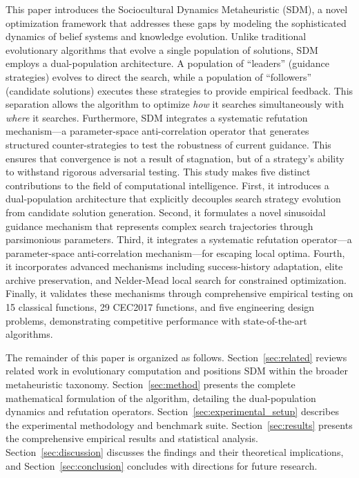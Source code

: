 \documentclass[11pt]{article}
\begin{document}
This paper introduces the Sociocultural Dynamics Metaheuristic (SDM), a novel optimization framework that addresses these gaps by modeling the sophisticated dynamics of belief systems and knowledge evolution. Unlike traditional evolutionary algorithms that evolve a single population of solutions, SDM employs a dual-population architecture. A population of ``leaders'' (guidance strategies) evolves to direct the search, while a population of ``followers'' (candidate solutions) executes these strategies to provide empirical feedback. This separation allows the algorithm to optimize \textit{how} it searches simultaneously with \textit{where} it searches. Furthermore, SDM integrates a systematic refutation mechanism---a parameter-space anti-correlation operator that generates structured counter-strategies to test the robustness of current guidance. This ensures that convergence is not a result of stagnation, but of a strategy's ability to withstand rigorous adversarial testing.
This study makes five distinct contributions to the field of computational intelligence. First, it introduces a dual-population architecture that explicitly decouples search strategy evolution from candidate solution generation. Second, it formulates a novel sinusoidal guidance mechanism that represents complex search trajectories through parsimonious parameters. Third, it integrates a systematic refutation operator---a parameter-space anti-correlation mechanism---for escaping local optima. Fourth, it incorporates advanced mechanisms including success-history adaptation, elite archive preservation, and Nelder-Mead local search for constrained optimization. Finally, it validates these mechanisms through comprehensive empirical testing on 15 classical functions, 29 CEC2017 functions, and five engineering design problems, demonstrating competitive performance with state-of-the-art algorithms.

The remainder of this paper is organized as follows. Section~\ref{sec:related} reviews related work in evolutionary computation and positions SDM within the broader metaheuristic taxonomy. Section~\ref{sec:method} presents the complete mathematical formulation of the algorithm, detailing the dual-population dynamics and refutation operators. Section~\ref{sec:experimental_setup} describes the experimental methodology and benchmark suite. Section~\ref{sec:results} presents the comprehensive empirical results and statistical analysis. Section~\ref{sec:discussion} discusses the findings and their theoretical implications, and Section~\ref{sec:conclusion} concludes with directions for future research.
\end{document}

